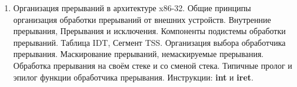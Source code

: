 \documentclass[a4paper,10pt]{article}
\begin{document}
\begin{enumerate}
    \item
        Организация прерываний в архитектуре x86-32. Общие принципы организация обработки прерываний от внешних устройств. Внутренние прерывания, 
        Прерывания и исключения. Компоненты подистемы обработки прерываний. Таблица IDT, Сегмент TSS. Организация выбора обработчика прерывания.
        Маскирование прерываний, немаскируемые прерывания. Обработка прерывания на своём стеке и со сменой стека. Типичные пролог и эпилог функции
        обработчика прерывания. Инструкции: \textbf{int} и \textbf{iret}.
\end{enumerate}
\end{document}

